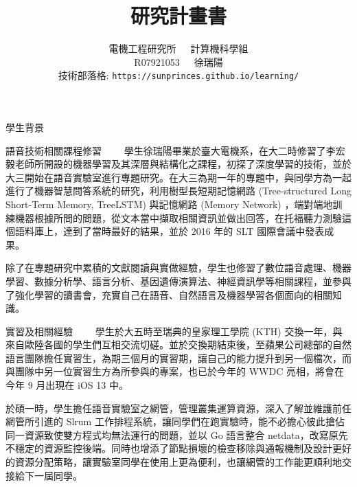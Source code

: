 \documentclass[12pt,UTF8,fntef]{article}
\title{研究計畫書}
\author{電機工程研究所~~~計算機科學組\\R07921053~~~徐瑞陽 \\ 技術部落格: \texttt{https://sunprinces.github.io/learning/}}
\date{}
\begin{document}
\maketitle

\begin{section}{學生背景}
  \begin{subsection}{語音技術相關課程修習}
~~~~學生徐瑞陽畢業於臺大電機系，在大二時修習了李宏毅老師所開設的機器學習及其深層與結構化之課程，初探了深度學習的技術，並於大三開始在語音實驗室進行專題研究。在大三為期一年的專題中，與同學方為一起進行了機器智慧問答系統的研究，利用樹型長短期記憶網路 (Tree-structured Long Short-Term Memory, TreeLSTM) 與記憶網路 (Memory Network) ，端對端地訓練機器根據所問的問題，從文本當中擷取相關資訊並做出回答，在托福聽力測驗這個語料庫上，達到了當時最好的結果，並於 2016 年的 SLT 國際會議中發表成果。

    除了在專題研究中累積的文獻閱讀與實做經驗，學生也修習了數位語音處理、機器學習、數據分析學、語言分析、基因遺傳演算法、神經資訊學等相關課程，並參與了強化學習的讀書會，充實自己在語音、自然語言及機器學習各個面向的相關知識。
  \end{subsection}

  \begin{subsection}{實習及相關經驗}
    ~~~~學生於大五時至瑞典的皇家理工學院 (KTH) 交換一年，與來自歐陸各國的學生們互相交流切磋。並於交換期結束後，至蘋果公司總部的自然語言團隊擔任實習生，為期三個月的實習期，讓自己的能力提升到另一個檔次，而與團隊中另一位實習生方為所參與的專案，也已於今年的 WWDC 亮相，將會在今年 9 月出現在 iOS 13 中。

    於碩一時，學生擔任語音實驗室之網管，管理叢集運算資源，深入了解並維護前任網管所引進的 Slrum 工作排程系統，讓同學們在跑實驗時，能不必擔心彼此搶佔同一資源致使雙方程式均無法運行的問題，並以 Go 語言整合 netdata，改寫原先不穩定的資源監控後端。同時也增添了節點損壞的檢查移除與通報機制及設計更好的資源分配策略，讓實驗室同學在使用上更為便利，也讓網管的工作能更順利地交接給下一屆同學。
  \end{subsection}
\end{section}
\end{document}
